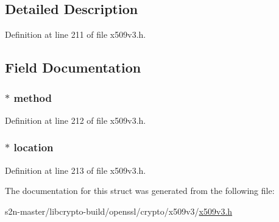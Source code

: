 \subsection{Detailed Description}


Definition at line 211 of file x509v3.\+h.



\subsection{Field Documentation}
\subsubsection[{\texorpdfstring{method}{method}}]{ $\ast$ method}\hypertarget{struct_a_c_c_e_s_s___d_e_s_c_r_i_p_t_i_o_n__st_a36cd19c137879012c23b76ea66bf8ba0}{}\label{struct_a_c_c_e_s_s___d_e_s_c_r_i_p_t_i_o_n__st_a36cd19c137879012c23b76ea66bf8ba0}


Definition at line 212 of file x509v3.\+h.

\subsubsection[{\texorpdfstring{location}{location}}]{ $\ast$ location}\hypertarget{struct_a_c_c_e_s_s___d_e_s_c_r_i_p_t_i_o_n__st_add8b55cb4d43ec454401e05f26753726}{}\label{struct_a_c_c_e_s_s___d_e_s_c_r_i_p_t_i_o_n__st_add8b55cb4d43ec454401e05f26753726}


Definition at line 213 of file x509v3.\+h.



The documentation for this struct was generated from the following file\+:\begin{DoxyCompactItemize}
\item 
s2n-\/master/libcrypto-\/build/openssl/crypto/x509v3/\hyperlink{crypto_2x509v3_2x509v3_8h}{x509v3.\+h}\end{DoxyCompactItemize}
